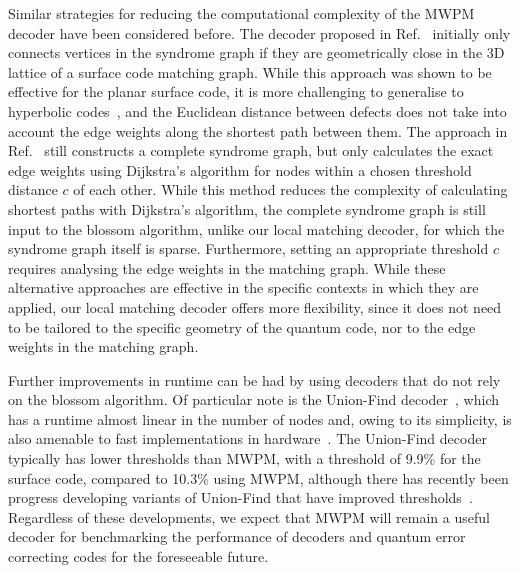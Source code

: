 \documentclass{article}
\begin{document}
\begin{algorithm}[h]
  \caption{Local Dijkstra Algorithm}
 \label{alg:local_dijkstra}
\end{algorithm}

Similar strategies for reducing the computational complexity of the MWPM decoder have been considered before. 
The decoder proposed in Ref.~\cite{fowler2012towards} initially only connects vertices in the syndrome graph if they are geometrically close in the 3D lattice of a surface code matching graph.
While this approach was shown to be effective for the planar surface code, it is more challenging to generalise to hyperbolic codes~\cite{breuckmann2016constructions}, and the Euclidean distance between defects does not take into account the edge weights along the shortest path between them.
The approach in Ref.~\cite{xu2019high} still constructs a complete syndrome graph, but only calculates the exact edge weights using Dijkstra's algorithm for nodes within a chosen threshold distance $c$ of each other.
While this method reduces the complexity of calculating shortest paths with Dijkstra's algorithm, the complete syndrome graph is still input to the blossom algorithm, unlike our local matching decoder, for which the syndrome graph itself is sparse.
Furthermore, setting an appropriate threshold $c$ requires analysing the edge weights in the matching graph.
While these alternative approaches are effective in the specific contexts in which they are applied, our local matching decoder offers more flexibility, since it does not need to be tailored to the specific geometry of the quantum code, nor to the edge weights in the matching graph.

Further improvements in runtime can be had by using decoders that do not rely on the blossom algorithm.
Of particular note is the Union-Find decoder~\cite{delfosse2017almost}, which has a runtime almost linear in the number of nodes and, owing to its simplicity, is also amenable to fast implementations in hardware~\cite{das2020scalable}.
The Union-Find decoder typically has lower thresholds than MWPM, with a threshold of 9.9\% for the surface code, compared to 10.3\% using MWPM, although there has recently been progress developing variants of Union-Find that have improved thresholds~\cite{huang2020fault,meinerz2021scalable,hu2020quasilinear}.
Regardless of these developments, we expect that MWPM will remain a useful decoder for benchmarking the performance of decoders and quantum error correcting codes for the foreseeable future.
\end{document}
